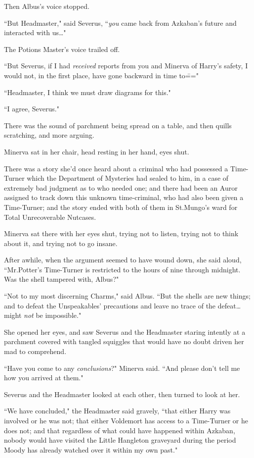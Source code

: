 Then Albus's voice stopped.

``But Headmaster," said Severus, ``\emph{you} came back from Azkaban's future and interacted with us{\ldots}"

The Potions Master's voice trailed off.

``But Severus, if I had \emph{received} reports from you and Minerva of Harry's safety, I would not, in the first place, have gone backward in time to\==="

``Headmaster, I think we must draw diagrams for this."

``I agree, Severus."

There was the sound of parchment being spread on a table, and then quills scratching, and more arguing.

Minerva sat in her chair, head resting in her hand, eyes shut.

There was a story she'd once heard about a criminal who had possessed a Time-Turner which the Department of Mysteries had sealed to him, in a case of extremely bad judgment as to who needed one; and there had been an Auror assigned to track down this unknown time-criminal, who had also been given a Time-Turner; and the story ended with both of them in St.\?Mungo's ward for Total Unrecoverable Nutcases.

Minerva sat there with her eyes shut, trying not to listen, trying not to think about it, and trying not to go insane.

After awhile, when the argument seemed to have wound down, she said aloud, ``Mr.\?Potter's Time-Turner is restricted to the hours of nine \pm through midnight. Was the shell tampered with, Albus?"

``Not to my most discerning Charms," said Albus. ``But the shells are new things; and to defeat the Unspeakables' precautions and leave no trace of the defeat{\ldots} might \emph{not} be impossible."

She opened her eyes, and saw Severus and the Headmaster staring intently at a parchment covered with tangled squiggles that would have no doubt driven her mad to comprehend.

``Have you come to any \emph{conclusions}?" Minerva said. ``And please don't tell me how you arrived at them."

Severus and the Headmaster looked at each other, then turned to look at her.

``We have concluded," the Headmaster said gravely, ``that either Harry was involved or he was not; that either Voldemort has access to a Time-Turner or he does not; and that regardless of what could have happened within Azkaban, nobody would have visited the Little Hangleton graveyard during the period Moody has already watched over it within my own past."

